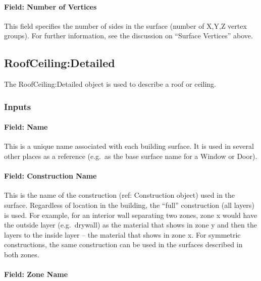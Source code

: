 \paragraph{Field: Number of Vertices}\label{field-number-of-vertices}

This field specifies the number of sides in the surface (number of X,Y,Z vertex groups). For further information, see the discussion on ``Surface Vertices'' above.

\subsection{RoofCeiling:Detailed}\label{roofceilingdetailed}

The RoofCeiling:Detailed object is used to describe a roof or ceiling.

\subsubsection{Inputs}\label{inputs-21-007}

\paragraph{Field: Name}\label{field-name-17-008}

This is a unique name associated with each building surface. It is used in several other places as a reference (e.g.~as the base surface name for a Window or Door).

\paragraph{Field: Construction Name}\label{field-construction-name-17}

This is the name of the construction (ref: Construction object) used in the surface. Regardless of location in the building, the ``full'' construction (all layers) is used. For example, for an interior wall separating two zones, zone x would have the outside layer (e.g.~drywall) as the material that shows in zone y and then the layers to the inside layer -- the material that shows in zone x. For symmetric constructions, the same construction can be used in the surfaces described in both zones.

\paragraph{Field: Zone Name}\label{field-zone-name-11-000}

